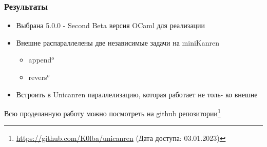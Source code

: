 \documentclass[aspectratio=169]{beamer}
\begin{document}
\begin{frame}
	\frametitle{Результаты}
	\begin{itemize}
		\item Выбрана 5.0.0 - Second Beta версия OCaml для реализации
		\item Внешне распараллелены две независимые задачи на miniKanren
		      \begin{itemize}
			      \item append$^{o}$
			      \item revers$^{o}$
		      \end{itemize}
		\item Встроить в Unicanren параллелизацию, которая работает не толь-
		      ко внешне
	\end{itemize}
	Всю проделанную работу можно посмотреть на github репозитории\footnote{\url{https://github.com/K0lba/unicanren} (Дата доступа: 03.01.2023)}

\end{frame}



\appendix
\end{document}
